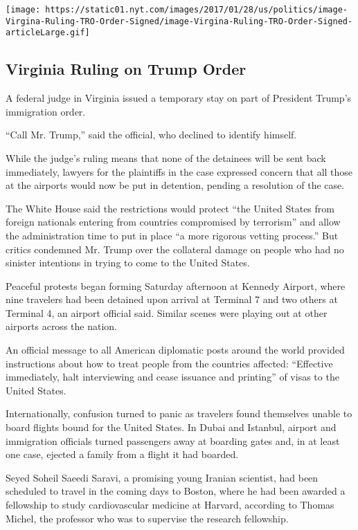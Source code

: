 \href{https://www.nytimes.com/interactive/2017/01/28/us/politics/document-Virgina-Ruling-TRO-Order-Signed.html}{}

\texttt{[image: https://static01.nyt.com/images/2017/01/28/us/politics/image-Virgina-Ruling-TRO-Order-Signed/image-Virgina-Ruling-TRO-Order-Signed-articleLarge.gif]}

\hypertarget{virginia-ruling-on-trump-order}{%
\subsection{Virginia Ruling on Trump
Order}\label{virginia-ruling-on-trump-order}}

A federal judge in Virginia issued a temporary stay on part of President
Trump's immigration order.

``Call Mr. Trump,'' said the official, who declined to identify himself.

While the judge's ruling means that none of the detainees will be sent
back immediately, lawyers for the plaintiffs in the case expressed
concern that all those at the airports would now be put in detention,
pending a resolution of the case.

The White House said the restrictions would protect ``the United States
from foreign nationals entering from countries compromised by
terrorism'' and allow the administration time to put in place ``a more
rigorous vetting process.'' But critics condemned Mr. Trump over the
collateral damage on people who had no sinister intentions in trying to
come to the United States.

Peaceful protests began forming Saturday afternoon at Kennedy Airport,
where nine travelers had been detained upon arrival at Terminal 7 and
two others at Terminal 4, an airport official said. Similar scenes were
playing out at other airports across the nation.

An official message to all American diplomatic posts around the world
provided instructions about how to treat people from the countries
affected: ``Effective immediately, halt interviewing and cease issuance
and printing'' of visas to the United States.

Internationally, confusion turned to panic as travelers found themselves
unable to board flights bound for the United States. In Dubai and
Istanbul, airport and immigration officials turned passengers away at
boarding gates and, in at least one case, ejected a family from a flight
it had boarded.

Seyed Soheil Saeedi Saravi, a promising young Iranian scientist, had
been scheduled to travel in the coming days to Boston, where he had been
awarded a fellowship to study cardiovascular medicine at Harvard,
according to Thomas Michel, the professor who was to supervise the
research fellowship.

